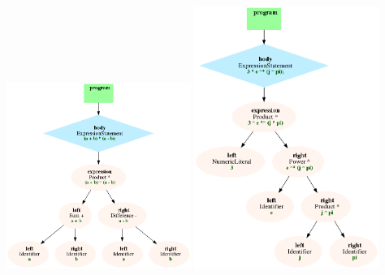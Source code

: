 \item

\includegraphics[width=0.45\textwidth]{../pool/ex-syntax-tree-1-img-a.png}
\includegraphics[width=0.45\textwidth]{../pool/ex-syntax-tree-1-img-b.png}
\\

